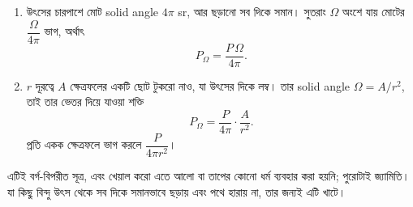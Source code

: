 \documentclass[11pt]{article}
\begin{document}
\begin{sol}
\begin{enumerate}
  \item উৎসের চারপাশে মোট solid angle $4\pi$ sr, আর ছড়ানো সব দিকে সমান। সুতরাং
        $\Omega$ অংশে যায় মোটের $\dfrac{\Omega}{4\pi}$ ভাগ, অর্থাৎ
        \[
          P_{\Omega} = \frac{P\,\Omega}{4\pi} .
        \]
  \item $r$ দূরত্বে $A$ ক্ষেত্রফলের একটি ছোট টুকরো নাও, যা উৎসের দিকে লম্ব।
        তার solid angle $\Omega = A/r^{2}$, তাই তার ভেতর দিয়ে যাওয়া শক্তি
        \[
          P_{\Omega} = \frac{P}{4\pi} \cdot \frac{A}{r^{2}} .
        \]
        প্রতি একক ক্ষেত্রফলে ভাগ করলে $\dfrac{P}{4\pi r^{2}}$।
\end{enumerate}
এটিই বর্গ-বিপরীত সূত্র, এবং খেয়াল করো এতে আলো বা তাপের কোনো ধর্ম ব্যবহার করা
হয়নি; পুরোটাই জ্যামিতি। যা কিছু বিন্দু উৎস থেকে সব দিকে সমানভাবে ছড়ায় এবং পথে
হারায় না, তার জন্যই এটি খাটে।
\end{sol}
\end{document}
